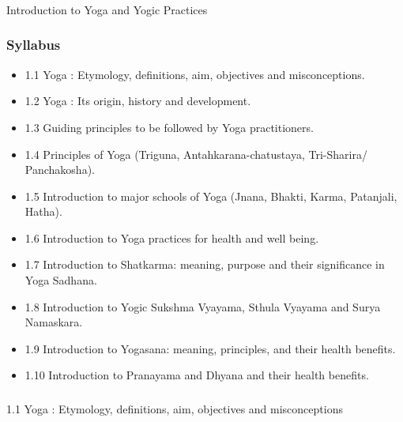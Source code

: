 \begin{frame}[fragile]\frametitle{}
\begin{center}
{\Large Introduction to Yoga and Yogic Practices}
\end{center}
\end{frame}

\begin{frame}[fragile]\frametitle{Syllabus}

\begin{itemize}
\item 1.1  Yoga : Etymology, definitions, aim, objectives and misconceptions. 
\item 1.2  Yoga : Its origin, history and development. 
\item 1.3  Guiding principles to be followed by Yoga practitioners.  
\item 1.4  Principles of Yoga (Triguna, Antahkarana-chatustaya, Tri-Sharira/ Panchakosha). 
\item 1.5  Introduction to major schools of Yoga (Jnana, Bhakti, Karma, Patanjali, Hatha). 
\item 1.6  Introduction to Yoga practices for health and well being. 
\item 1.7  Introduction to Shatkarma: meaning, purpose and their significance in Yoga Sadhana. 
\item 1.8  Introduction to Yogic  Sukshma Vyayama,  Sthula Vyayama and Surya Namaskara.  
\item 1.9  Introduction to Yogasana: meaning, principles, and their health benefits. 
\item 1.10  Introduction to Pranayama and Dhyana and their health benefits. 
\end{itemize}
	  
\end{frame}

\begin{frame}[fragile]\frametitle{}
\begin{center}
{\Large 1.1 Yoga : Etymology, definitions, aim, objectives and misconceptions}
\end{center}
\end{frame}

